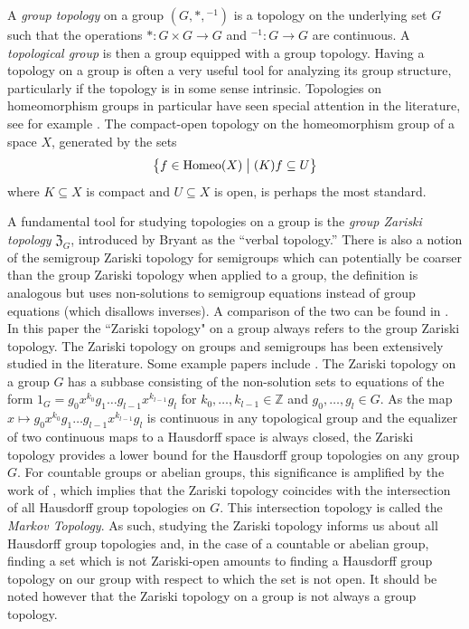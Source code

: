 \documentclass[11pt]{amsart}
\makeatletter
\newcommand{\Z}{\mathbb Z}
\newcommand{\makeset}[2]{\left\lbrace #1 \;\middle|\;
 \begin{tabular}{@{}l@{}}
   #2
  \end{tabular}
  \right\rbrace}
\makeatother
\begin{document}
A \emph{group topology} on a group \((G,*, {}^{-1})\) is a topology on the underlying set \(G\) such that the operations \(*:G\times G\to G\) and \({}^{-1}:G\to G\) are continuous.
A \emph{topological group} is then a group equipped with a group topology.
    Having a topology on a group is often a very useful tool for analyzing its group structure, particularly if the topology is in some sense intrinsic.
    Topologies on homeomorphism groups in particular have seen special attention in the literature, see for example \cite{arens1946topologies,dieudonne1948topological,dijkstra2005homeomorphism,mostert1961reasonable}.
    The compact-open topology on the homeomorphism group of a space \(X\), generated by the sets
   \[\makeset{f\in \operatorname{Homeo}(X)}{\((K)f\subseteq U\)}\]
where \(K\subseteq X\) is compact and \(U\subseteq X\) is open, is perhaps the most standard.
    
    A fundamental tool for studying topologies on a group is the \emph{group Zariski topology} $\mathfrak{Z}_G$, introduced by Bryant \cite{bryant1977verbal} as the ``verbal topology.'' There is also a notion of the semigroup Zariski topology for semigroups which can potentially be coarser than the group Zariski topology when applied to a group, the definition is analogous but uses non-solutions to semigroup equations instead of group equations (which disallows inverses). A comparison of the two can be found in \cite{bardyla2025note}.
    In this paper the ``Zariski topology" on a group always refers to the group Zariski topology.
The Zariski topology on groups and semigroups has been extensively studied in the literature. Some example papers include \cite{bryant1977verbal,DDSabelianzariski,banakh2012algebraically,bardyla2025note,pinsker2023zariski,dikranjan2012markov,banakh2010zariski,goffer2024note,elliott2023automatic,marimon2025guide, elliott2022constructing, zbMATH06893997,zbMATH07781608,zbMATH06300237,zbMATH05232892}.
The Zariski topology on a group \(G\) has a subbase consisting of the non-solution sets to equations of the form \(1_G=g_0 x^{k_0} g_1 \dots g_{l-1} x^{k_{l-1}} g_l\) for \(k_0,\ldots, k_{l-1}\in \Z\) and \(g_0,\ldots, g_l\in G\). As the map \(x\mapsto g_0 x^{k_0} g_1 \dots g_{l-1} x^{k_{l-1}} g_l\) is continuous in any topological group and the equalizer of two continuous maps to a Hausdorff space is always closed,  the Zariski topology provides a lower bound for the Hausdorff group topologies on any group $G$. 
For countable groups or abelian groups, this significance is amplified by the work of \cite{markov1946unconditionally, DDSabelianzariski}, which implies that the Zariski topology coincides with the intersection of all Hausdorff group topologies on $G$. This intersection topology is called the \emph{Markov Topology}.
As such, studying the Zariski topology informs us about all Hausdorff group topologies and, in the case of a countable or abelian group, finding a set which is not Zariski-open amounts to finding a Hausdorff group topology on our group with respect to which the set is not open. It should be noted however that the Zariski topology on a group is not always a group topology.
\end{document}
